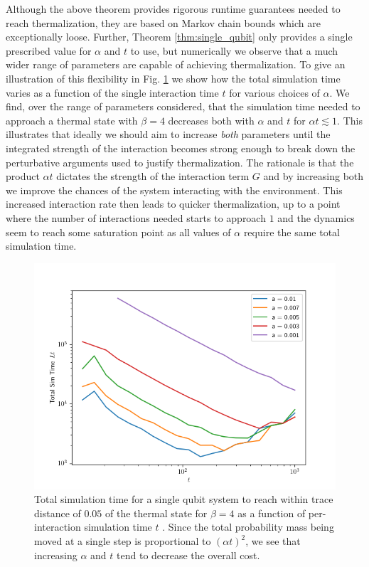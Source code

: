 \documentclass{article}
\begin{document}
 Although the above theorem provides rigorous runtime guarantees needed to reach thermalization, they are based on Markov chain bounds which are exceptionally loose. %
 Further, Theorem \ref{thm:single_qubit} only provides a single prescribed value for $\alpha$ and $t$ to use, but numerically we observe that a much wider range of parameters are capable of achieving thermalization. To give an illustration of this flexibility in Fig. \ref{fig:tot_time_vs_single_time} we show how the total simulation time varies as a function of the single interaction time $t$ for various choices of $\alpha$. We find, over the range of parameters considered, that the simulation time needed to approach a thermal state with $\beta=4$  decreases both with $\alpha$ and $t$ for $\alpha t\lesssim 1$.  This illustrates that ideally we  should aim to increase \emph{both} parameters until the integrated strength of the interaction becomes strong enough to break down the perturbative arguments used to justify thermalization. The rationale is that the product $\alpha t$ dictates the strength of the interaction term $G$ and by increasing both we improve the chances of the system interacting with the environment. This increased interaction rate then leads to quicker thermalization, up to a point where the number of interactions needed starts to approach $1$ and the dynamics seem to reach some saturation point as all values of $\alpha$ require the same total simulation time.


\begin{figure} 
    \centering
    \includegraphics[width=0.75\linewidth]{numerics/data/total_time_vs_time.png}
    \caption{Total simulation time for a single qubit system to reach within trace distance of $0.05$ of the thermal state for $\beta = 4$ as a function of per-interaction simulation time $t$ . Since the total probability mass being moved at a single step is proportional to $(\alpha t)^2$, we see that increasing $\alpha$ and $t$ tend to decrease the overall cost.}\label{fig:tot_time_vs_single_time}
\end{figure}
\end{document}
